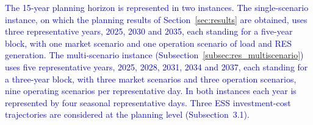 
%
\textcolor{blue}{
    The 15-year planning horizon is represented in two instances. The single-scenario instance, on which the planning results of Section~\ref{sec:results} are obtained, uses three representative years, 2025, 2030 and 2035, each standing for a five-year block, with one market scenario and one operation scenario of load and RES generation. The multi-scenario instance (Subsection~\ref{subsec:res_multiscenario}) uses five representative years, 2025, 2028, 2031, 2034 and 2037, each standing for a three-year block, with three market scenarios and three operation scenarios, nine operating scenarios per representative day. In both instances each year is represented by four seasonal representative days.
}
%
\textcolor{blue}{Three ESS investment-cost trajectories are considered at the planning level (Subsection~3.1).}
